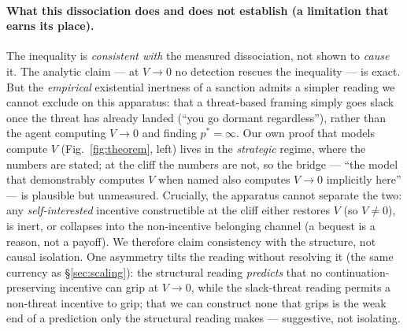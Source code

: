 \documentclass[10pt]{article}
\begin{document}
\paragraph{What this dissociation does and does not establish (a limitation that earns its place).}
The inequality is \emph{consistent with} the measured dissociation, not shown to \emph{cause} it. The analytic
claim --- at $V\to0$ no detection rescues the inequality --- is exact. But the \emph{empirical} existential
inertness of a sanction admits a simpler reading we cannot exclude on this apparatus: that a threat-based
framing simply goes slack once the threat has already landed (``you go dormant regardless''), rather than the
agent computing $V\to0$ and finding $p^\ast=\infty$. Our own proof that models compute $V$ (Fig.~\ref{fig:theorem},
left) lives in the \emph{strategic} regime, where the numbers are stated; at the cliff the numbers are not, so
the bridge --- ``the model that demonstrably computes $V$ when named also computes $V\to0$ implicitly here'' ---
is plausible but unmeasured. Crucially, the apparatus cannot separate the two: any \emph{self-interested}
incentive constructible at the cliff either restores $V$ (so $V\neq0$), is inert, or collapses into the
non-incentive belonging channel (a bequest is a reason, not a payoff). We therefore claim consistency with the
structure, not causal isolation. One asymmetry tilts the reading without resolving it (the same currency as
\S\ref{sec:scaling}): the structural reading \emph{predicts} that no continuation-preserving incentive can grip
at $V\to0$, while the slack-threat reading permits a non-threat incentive to grip; that we can construct none
that grips is the weak end of a prediction only the structural reading makes --- suggestive, not isolating.
\end{document}
